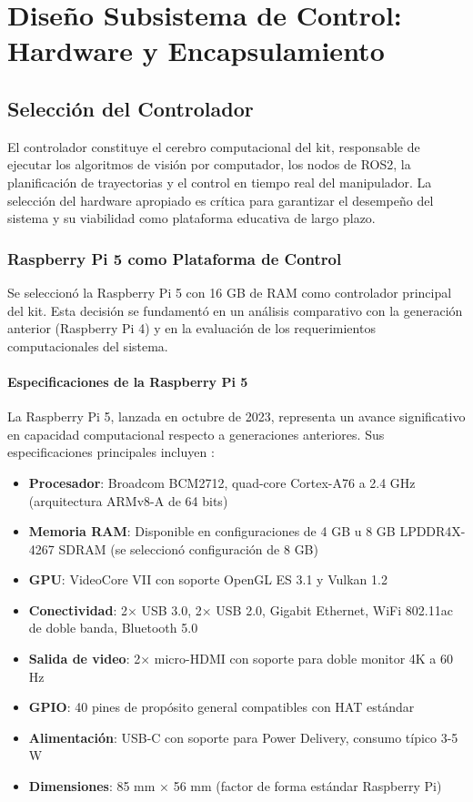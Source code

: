 \section{Diseño Subsistema de Control: Hardware y Encapsulamiento}

\subsection{Selección del Controlador}

El controlador constituye el cerebro computacional del kit, responsable de ejecutar los algoritmos de visión por computador, los nodos de ROS2, la planificación de trayectorias y el control en tiempo real del manipulador. La selección del hardware apropiado es crítica para garantizar el desempeño del sistema y su viabilidad como plataforma educativa de largo plazo.

\subsubsection{Raspberry Pi 5 como Plataforma de Control}

Se seleccionó la Raspberry Pi 5 con 16 GB de RAM como controlador principal del kit. Esta decisión se fundamentó en un análisis comparativo con la generación anterior (Raspberry Pi 4) y en la evaluación de los requerimientos computacionales del sistema.

\paragraph{Especificaciones de la Raspberry Pi 5}

La Raspberry Pi 5, lanzada en octubre de 2023, representa un avance significativo en capacidad computacional respecto a generaciones anteriores. Sus especificaciones principales incluyen \cite{RaspberryPi2023}:

\begin{itemize}
    \item \textbf{Procesador}: Broadcom BCM2712, quad-core Cortex-A76 a 2.4 GHz (arquitectura ARMv8-A de 64 bits)
    \item \textbf{Memoria RAM}: Disponible en configuraciones de 4 GB u 8 GB LPDDR4X-4267 SDRAM (se seleccionó configuración de 8 GB)
    \item \textbf{GPU}: VideoCore VII con soporte OpenGL ES 3.1 y Vulkan 1.2
    \item \textbf{Conectividad}: 2× USB 3.0, 2× USB 2.0, Gigabit Ethernet, WiFi 802.11ac de doble banda, Bluetooth 5.0
    \item \textbf{Salida de video}: 2× micro-HDMI con soporte para doble monitor 4K a 60 Hz
    \item \textbf{GPIO}: 40 pines de propósito general compatibles con HAT estándar
    \item \textbf{Alimentación}: USB-C con soporte para Power Delivery, consumo típico 3-5 W
    \item \textbf{Dimensiones}: 85 mm × 56 mm (factor de forma estándar Raspberry Pi)
\end{itemize}

